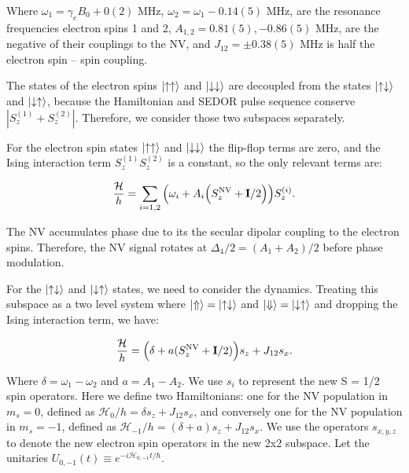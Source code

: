 \documentclass[%
 reprint,
 amsmath,amssymb,
 aps,
]{revtex4-1}
\begin{document}
Where $\omega_1 = \gamma_e B_{0} + 0(2) \text{ MHz}$, $\omega_2 = \omega_1 - 0.14(5) \text{ MHz}$, are the resonance frequencies electron spins 1 and 2, $A_{1,2}=0.81(5),-0.86(5) \text{ MHz}$, are the negative of their couplings to the NV, and $J_{12}= \pm 0.38(5) \text{ MHz}$ is half the electron spin -- spin coupling. 

The states of the electron spins $\ket{\uparrow\uparrow}$ and $\ket{\downarrow\downarrow}$ are decoupled from the states $\ket{\uparrow\downarrow}$ and $\ket{\downarrow\uparrow}$, because the Hamiltonian and SEDOR pulse sequence conserve $|S_{z}^{(1)} + S_{z}^{(2)}|$. Therefore, we consider those two subspaces separately.

For the electron spin states $\ket{\uparrow\uparrow}$ and $\ket{\downarrow\downarrow}$ the flip-flop terms are zero, and the Ising interaction term $S_{z}^{(1)}S_{z}^{(2)}$ is a constant, so the only relevant terms are: 

\begin{align}
\frac{\mathcal{H}}{h} = \sum_{i = 1,2} {\Big(\omega_i + A_i\Big(S_{z}^{\text{NV}} + {\bf{I}} /2\Big)}\Big)S_{z}^{(i)}.
\end{align}

The NV accumulates phase due to its the secular dipolar coupling to the electron spins. Therefore, the NV signal rotates at $\Delta_{4}/2 = (A_1 + A_2)/2$ before phase modulation. 

For the $\ket{\uparrow\downarrow}$ and $\ket{\downarrow\uparrow}$ states, we need to consider the dynamics. Treating this subspace as a two level system where $\ket{\Uparrow} = \ket{\uparrow\downarrow}$ and $\ket{\Downarrow} = \ket{\downarrow \uparrow}$ and dropping the Ising interaction term, we have: 

\begin{align}
\frac{\mathcal{H}}{h} = \Big(\delta + a(S_{z}^{\text{NV}} + {\bf{I}} /2)\Big)s_{z} + J_{12} s_{x}.
\end{align}

Where $\delta = \omega_{1}-\omega_{2}$ and $a = A_{1}-A_{2}$. We use $s_{i}$ to represent the new S = 1/2 spin operators. Here we define two Hamiltonians: one for the NV population in $m_s = 0$, defined as $\mathcal{H}_{0}/h = \delta s_{z} + J_{12} s_{x}$, and conversely one for the NV population in $m_s = -1$, defined as $\mathcal{H}_{-1}/h = (\delta + a)s_{z} + J_{12} s_{x}$. We use the operators $s_{x,y,z}$ to denote the new electron spin operators in the new 2x2 subspace. Let the unitaries $U_{0, -1}(t) \equiv e^{-i \mathcal{H}_{0, -1}t/\hbar}$. 
\end{document}
